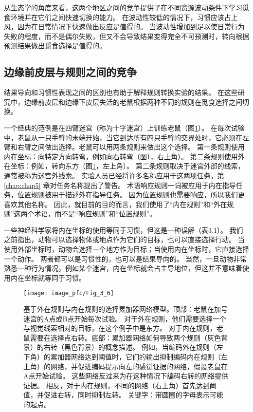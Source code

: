 从生态学的角度来看，这两个地区之间的竞争提供了在不同资源波动条件下学习觅食环境并在它们之间快速切换的能力。
在波动性较低的情况下，习惯应该占上风，因为在日常情况下快速做出反应是值得的。
当波动性增加到足以使日常行为失败的程度，而不是偶尔失败，但又不会导致结果变得完全不可预测时，转向根据预测结果做出觅食选择是值得的。\par



\subsection{边缘前皮层与规则之间的竞争}

结果导向和习惯性表现之间的区别也有助于解释规则转换实验的结果。
在这些研究中，边缘前皮层和边缘下皮层失活的老鼠根据两种不同的规则在觅食选择之间切换。\par


一个经典的范例是在四臂迷宫（称为十字迷宫）上训练老鼠（图\ref{fig:3_6}）。
在每次试验中，老鼠从一只手臂的末端开始，当它到达所有四只手臂的交界处时，它必须在左臂和右臂之间做出选择。老鼠可以用两条规则来做出这个选择。
第一条规则使用内在坐标：向特定方向转弯，例如向右转弯（图\ref{fig:3_6}，右上角）。
第二条规则使用外在坐标：例如，转向东方（图\ref{fig:3_6}，左上角）。
第二条规则取决于迷宫外部的线索，通常被称为迷宫外线索。
实验人员已经将许多名称应用于这两项任务，第 \ref{chap:chap5} 章对任务名称提出了警告。
术语响应规则一词被应用于内在指导任务，位置规则被用于描述外在指导任务。
因为位置规则也需要响应，所以我们更喜欢其他名称。
因此，就目前的目的而言，我们使用了“内在规则”和“外在规则”这两个术语，而不是“响应规则”和“位置规则”。\par


一些神经科学家将内在坐标的使用等同于习惯，但这是一种误解（表3.1）。
我们之前指出，动物可以选择物体或地点作为它们的目标，也可以直接选择行动。
当使用外部坐标时，动物会选择一个地方作为目标；当使用内在坐标时，它直接选择一个动作。
两者都可以是习惯性的，也可以是结果导向的。
当然，一旦动物非常熟悉一种行为情况，例如某个迷宫，内在坐标就会占主导地位，但这并不意味着使用内在坐标就等同于习惯。\par


\begin{figure}[!htb]
	\centering
	\texttt{[image: image\_pfc/Fig\_3\_6]}
	\caption{基于外在规则与内在规则的选择累加器网络模型。顶部：老鼠在加号迷宫的A点或B点开始每次试验。
		对于外在规则，他们需要选择一个与视觉线索相对的目标，在这个例子中是东方。
		对于内在规则，老鼠需要在选择点右转。底部：累加器网络如何导致两个规则（灰色背景）的右转（黑色背景）的概念描述。
		例如，当编码外在规则（左下角）的累加器网络达到阈值时，它们的输出抑制编码内在规则（左上角）的网络，并促进编码提示向左的感觉证据的网络，假设老鼠在A点开始试验。
		这些网络反过来为在这种情况下编码右转的网络提供证据。
		相反，对于内在规则，不同的网络（右上角）首先达到阈值，并促进右转，同时抑制左转。
		关键字：带圆圈的字母表示可能的起点。}
	\label{fig:3_6}
\end{figure}


